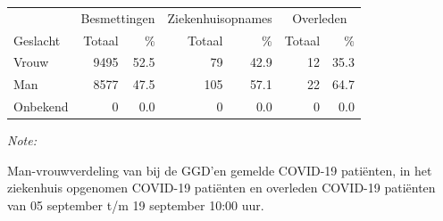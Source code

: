 \documentclass[
  english,
  man,floatsintext]{apa6}
\begin{document}
\begin{table}[H]
\centering\begingroup\fontsize{11}{13}\selectfont

\begin{threeparttable}
\begin{tabular}{lrrrrrr}
\toprule
\multicolumn{1}{c}{ } & \multicolumn{2}{c}{Besmettingen} & \multicolumn{2}{c}{Ziekenhuisopnames} & \multicolumn{2}{c}{Overleden} \\
\cmidrule(l{3pt}r{3pt}){2-3} \cmidrule(l{3pt}r{3pt}){4-5} \cmidrule(l{3pt}r{3pt}){6-7}
Geslacht & Totaal & \% & Totaal & \% & Totaal & \%\\
\midrule
Vrouw & 9495 & 52.5 & 79 & 42.9 & 12 & 35.3\\
Man & 8577 & 47.5 & 105 & 57.1 & 22 & 64.7\\
Onbekend & 0 & 0.0 & 0 & 0.0 & 0 & 0.0\\
\bottomrule
\end{tabular}
\begin{tablenotes}
\item \textit{Note: } 
\item Man-vrouwverdeling van bij de GGD’en gemelde COVID-19 patiënten, in het ziekenhuis opgenomen COVID-19 patiënten en overleden COVID-19 patiënten van 05 september t/m 19 september 10:00 uur.
\end{tablenotes}
\end{threeparttable}
\endgroup{}
\end{table}
\newpage
\end{document}
